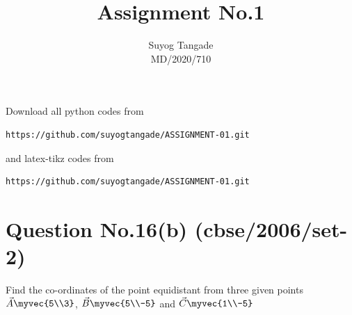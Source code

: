 \documentclass[journal,12pt,twocolumn]{IEEEtran}
\begin{document}
\def\rightbox#1{\makebox[0in][r]{#1}}
\def\centbox#1{\makebox[0in]{#1}}
\def\topbox#1{\raisebox{-\baselineskip}[0in][0in]{#1}}
\def\midbox#1{\raisebox{-0.5\baselineskip}[0in][0in]{#1}}
\vspace{3cm}
\title{Assignment No.1} 
\author{Suyog Tangade\\MD/2020/710} 
\maketitle
\newpage
\bigskip
\renewcommand{\thefigure}{\theenumi}
\renewcommand{\thetable}{\theenumi}
Download all python codes from
\begin{lstlisting}
https://github.com/suyogtangade/ASSIGNMENT-01.git
\end{lstlisting}
%
and latex-tikz codes from
%
\begin{lstlisting}
https://github.com/suyogtangade/ASSIGNMENT-01.git
\end{lstlisting}
%
\section{Question No.16(b) (cbse/2006/set-2)}

Find the co-ordinates of the point equidistant from three given points $\vec{A}\myvec{5\\3}$, $\vec{B}\myvec{5\\-5}$ and $\vec{C}\myvec{1\\-5}$ 
\solution
\end{document}
